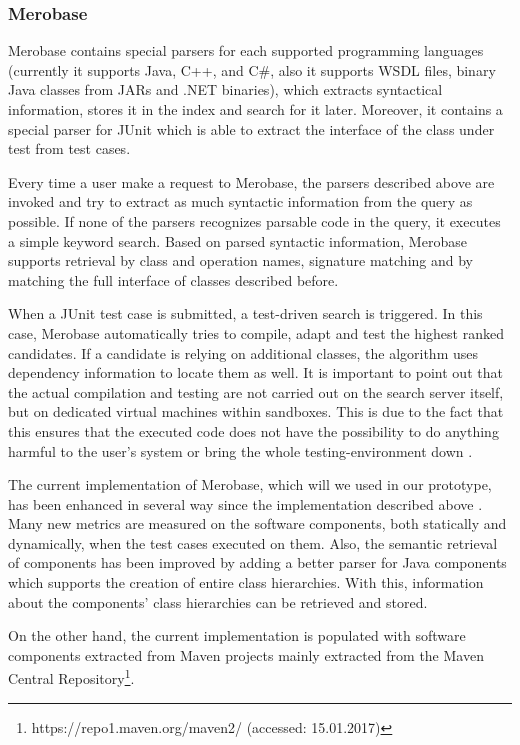\subsubsection{Merobase}
\label{subsec:merobase}

Merobase contains special parsers for each supported programming languages (currently it supports Java, C++, and C\#, also it supports WSDL files, binary Java classes from JARs and .NET binaries), which extracts syntactical information, stores it in the index and search for it later. Moreover, it contains a special parser for JUnit which is able to extract the interface of the class under test from test cases.

Every time a user make a request to Merobase, the parsers described above are invoked and try to extract as much syntactic information from the query as possible. If none of the parsers recognizes parsable code in the query, it executes a simple keyword search. Based on parsed syntactic information, Merobase supports retrieval by class and operation names, signature matching and by matching the full interface of classes described before.

When a JUnit test case is submitted, a test-driven search is triggered. In this case, Merobase automatically tries to compile, adapt and test the highest ranked candidates. If a candidate is relying on additional classes, the algorithm uses dependency information to locate them as well. It is important to point out that the actual compilation and testing are not carried out on the search server itself, but on dedicated virtual machines within sandboxes. This is due to the fact that this ensures that the executed code does not have the possibility to do anything harmful to the user's system or bring the whole testing-environment down \cite{Hummel2013}.

The current implementation of Merobase, which will we used in our prototype, has been enhanced in several way since the implementation described above \cite{Kessel2016}. Many new metrics are measured on the software components, both statically and dynamically, when the test cases executed on them. Also, the semantic retrieval of components has been improved by adding a better parser for Java components which supports the creation of entire class hierarchies. With this, information about the components' class hierarchies can be retrieved and stored.

On the other hand, the current implementation is populated with software components extracted from Maven projects mainly extracted from the Maven Central Repository\footnote{https://repo1.maven.org/maven2/ (accessed: 15.01.2017)}. 

